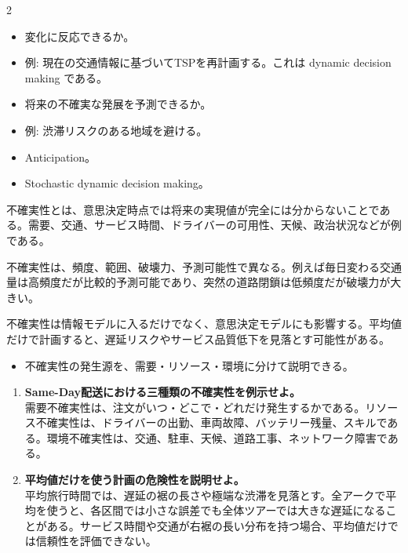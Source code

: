 \clearpage
{}
\begin{multicols}{2}\footnotesize\raggedcolumns
{}
\begin{itemize}
\item 変化に反応できるか。
\item 例: 現在の交通情報に基づいてTSPを再計画する。これは dynamic decision making である。
\item 将来の不確実な発展を予測できるか。
\item 例: 渋滞リスクのある地域を避ける。
\item Anticipation。
\item Stochastic dynamic decision making。
\end{itemize}
不確実性とは、意思決定時点では将来の実現値が完全には分からないことである。需要、交通、サービス時間、ドライバーの可用性、天候、政治状況などが例である。\par

不確実性は、頻度、範囲、破壊力、予測可能性で異なる。例えば毎日変わる交通量は高頻度だが比較的予測可能であり、突然の道路閉鎖は低頻度だが破壊力が大きい。\par

不確実性は情報モデルに入るだけでなく、意思決定モデルにも影響する。平均値だけで計画すると、遅延リスクやサービス品質低下を見落とす可能性がある。\par
{}
\begin{itemize}
\item 不確実性の発生源を、需要・リソース・環境に分けて説明できる。
\end{itemize}
\begin{enumerate}
\item \textbf{Same-Day配送における三種類の不確実性を例示せよ。}\\需要不確実性は、注文がいつ・どこで・どれだけ発生するかである。リソース不確実性は、ドライバーの出勤、車両故障、バッテリー残量、スキルである。環境不確実性は、交通、駐車、天候、道路工事、ネットワーク障害である。
\item \textbf{平均値だけを使う計画の危険性を説明せよ。}\\平均旅行時間では、遅延の裾の長さや極端な渋滞を見落とす。全アークで平均を使うと、各区間では小さな誤差でも全体ツアーでは大きな遅延になることがある。サービス時間や交通が右裾の長い分布を持つ場合、平均値だけでは信頼性を評価できない。
\end{enumerate}
\end{multicols}
